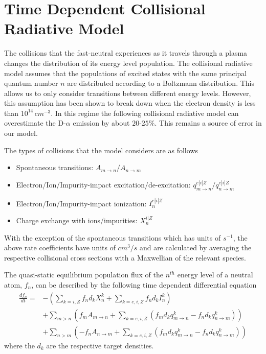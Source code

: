 \chapter{Time Dependent Collisional Radiative Model} \label{app:colrad}

The collisions that the fast-neutral experiences as it travels through a plasma changes the distribution of its energy level population. The collisional radiative model assumes that the populations of excited states with the same principal quantum number $n$ are distributed according to a Boltzmann distribution. This allows us to only consider transitions between different energy levels. However, this assumption has been shown\cite{marchuk2012} to break down when the electron density is less than $10^{14}\, cm^{-3}$. In this regime the following collisional radiative model can overestimate the D-$\alpha$ emission by about $20\mbox{-}25\%$. This remains a source of error in our model.

The types of collisions that the model considers are as follows
\begin{itemize}
    \item Spontaneous transitions: $A_{m \rightarrow n} / A_{n \rightarrow m}$
    \item Electron/Ion/Impurity-impact excitation/de-excitation: $q^{e|i|Z}_{m \rightarrow n} / q^{e|i|Z}_{n \rightarrow m}$
    \item Electron/Ion/Impurity-impact ionization: $I^{e|i|Z}_n$
    \item Charge exchange with ions/impurities: $X^{i|Z}_n$
\end{itemize}
With the exception of the spontaneous transitions which has units of $s^{-1}$, the above rate coefficients have units of $cm^3/s$ and are calculated by averaging the respective collisional cross sections with a Maxwellian of the relevant species. 

The quasi-static equilibrium population flux of the $n^{th}$ energy level of a neutral atom, $f_n$, can be described by the following time dependent differential equation
\begin{align*}
    \frac{df_n}{dt} = &- \left ( \sum_{k=i,Z} f_n d_k X^k_n + \sum_{k=e,i,Z} f_n d_k I^k_n \right )\\
    & + \sum_{m>n} \left (f_m A_{m \rightarrow n} + \sum_{k=e,i,Z} (f_m d_k q^k_{m \rightarrow n} - f_n d_k q^k_{n \rightarrow m}) \right ) \\  
    & + \sum_{n>m} \left (-f_n A_{n \rightarrow m} + \sum_{k=e,i,Z} (f_m d_k q^k_{m \rightarrow n} - f_n d_k q^k_{n \rightarrow m}) \right )
\end{align*}  
where the $d_k$ are the respective target densities.

